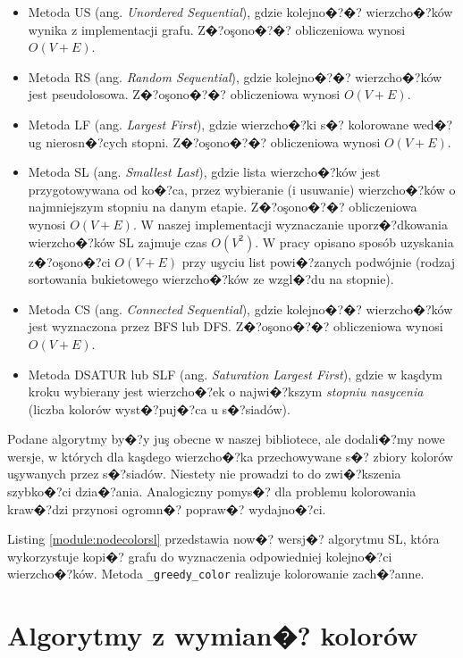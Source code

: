\documentclass[12pt,a4paper]{mwrep}
\begin{document}
\begin{itemize}
\item
Metoda US (ang. \emph{Unordered Sequential}), gdzie 
kolejno�?�? wierzcho�?ków wynika z implementacji grafu.
Z�?oşono�?�? obliczeniowa wynosi $O(V+E)$.
\item
Metoda RS (ang. \emph{Random Sequential}), gdzie
kolejno�?�? wierzcho�?ków jest pseudolosowa.
Z�?oşono�?�? obliczeniowa wynosi $O(V+E)$.
\item
Metoda LF (ang. \emph{Largest First}), gdzie
wierzcho�?ki s�? kolorowane wed�?ug nierosn�?cych stopni.
Z�?oşono�?�? obliczeniowa wynosi $O(V+E)$.
\item
Metoda SL (ang. \emph{Smallest Last}), gdzie lista wierzcho�?ków
jest przygotowywana od ko�?ca, przez wybieranie (i usuwanie) 
wierzcho�?ków o najmniejszym stopniu na danym etapie.
Z�?oşono�?�? obliczeniowa wynosi $O(V+E)$.
W naszej implementacji wyznaczanie uporz�?dkowania wierzcho�?ków SL
zajmuje czas $O(V^2)$. W pracy
\cite{2008_Matula_Beck}
opisano sposób uzyskania z�?oşono�?ci $O(V+E)$ przy uşyciu list
powi�?zanych podwójnie (rodzaj sortowania bukietowego wierzcho�?ków
ze wzgl�?du na stopnie).
\item
Metoda CS (ang. \emph{Connected Sequential}), gdzie
kolejno�?�? wierzcho�?ków jest wyznaczona przez BFS lub DFS.
Z�?oşono�?�? obliczeniowa wynosi $O(V+E)$.
\item
Metoda DSATUR lub SLF (ang. \emph{Saturation Largest First}), gdzie
w kaşdym kroku wybierany jest wierzcho�?ek o najwi�?kszym 
\emph{stopniu nasycenia} (liczba kolorów wyst�?puj�?ca u s�?siadów).
\end{itemize}
Podane algorytmy by�?y juş obecne w naszej bibliotece,
ale dodali�?my nowe wersje, w których dla kaşdego wierzcho�?ka 
przechowywane s�? zbiory kolorów uşywanych przez s�?siadów.
Niestety nie prowadzi to do zwi�?kszenia szybko�?ci dzia�?ania.
Analogiczny pomys�? dla problemu kolorowania kraw�?dzi przynosi
ogromn�? popraw�? wydajno�?ci.

Listing \ref{module:nodecolorsl} przedstawia now�? wersj�?
algorytmu SL, która wykorzystuje kopi�? grafu do wyznaczenia
odpowiedniej kolejno�?ci wierzcho�?ków.
Metoda \lstinline|_greedy_color| realizuje kolorowanie zach�?anne.



\section{Algorytmy z wymian�? kolorów}
\label{sec:color_interchange}
\end{document}
